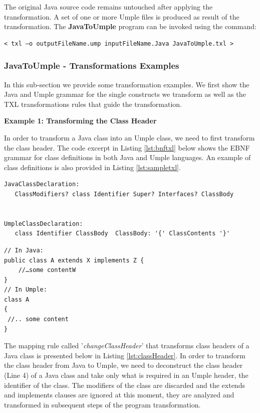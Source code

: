 The original Java source code remains untouched after applying the transformation. A set of one or more Umple files is produced as result of the transformation. The \textbf{JavaToUmple} program can be invoked using the command:
\vspace{\baselineskip}
\begin{lstlisting}[style=umplePlain]
< txl –o outputFileName.ump inputFileName.Java JavaToUmple.txl >
\end{lstlisting}

\subsubsection{JavaToUmple - Transformations Examples}

In this sub-section we provide some transformation examples. We first show the Java and Umple grammar for the single constructs we transform as well as the TXL transformations rules that guide the transformation.

\textbf{Example 1: Transforming the Class Header} \

In order to transform a Java class into an Umple class, we need to first transform the class header. The code excerpt in Listing \ref{lst:bnftxl} below shows the EBNF grammar for class definitions in both Java and Umple languages. An example of class definitions is also provided in Listing \ref{lst:sampletxl}.

\begin{lstlisting}[style=umplePlain, caption="Class definition grammar in BNF form", label=lst:bnftxl]
JavaClassDeclaration: 
   ClassModifiers? class Identifier Super? Interfaces? ClassBody


UmpleClassDeclaration: 
   class Identifier ClassBody  ClassBody: '{' ClassContents '}'

\end{lstlisting}

\begin{lstlisting}[style=umplePlain, caption=Class definitions in Java and Umple, label=lst:sampletxl]
// In Java:
public class A extends X implements Z {
    //…some contentW
}
// In Umple:
class A 
{	
 //.. some content
}
\end{lstlisting}

The mapping rule called '\textit{changeClassHeader}' that transforms class headers of a Java class is presented below in Listing \ref{lst:classHeader}. In order to transform the class header from Java to Umple, we need to deconstruct the class header  (Line 4)  of a Java class and take only what is required in an Umple header, the identifier of the class. The modifiers of the class are discarded and the extends and implements clauses are ignored at this moment, they are analyzed and transformed in subsequent steps of the program transformation. 

